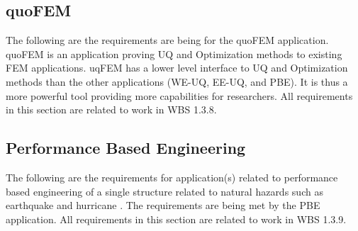 \documentclass{simcenterdocumentation}
\begin{document}
 

\clearpage
\subsection{quoFEM}
The following are the requirements are being for the quoFEM application. quoFEM is an application proving UQ and Optimization methods to existing FEM applications. uqFEM has a lower level interface to UQ and Optimization methods than the other applications (WE-UQ, EE-UQ, and PBE). It is thus a more powerful tool providing more capabilities for researchers. All requirements in this section are related to work in WBS 1.3.8.

 



\clearpage
\subsection{Performance Based Engineering}
The following are the requirements for application(s) related to performance based engineering of a single structure related to natural hazards such as earthquake and hurricane . The requirements are being met by the PBE application. All requirements in this section are related to work in WBS 1.3.9.

 


\nocite{*}


\pagestyle{plain}
{
  \renewcommand{\thispagestyle}[1]{}	
  \printbibliography           
}
\end{document}
